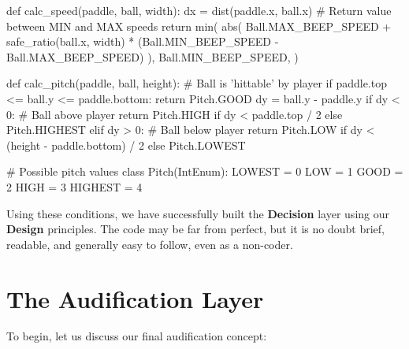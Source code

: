 \documentclass{report}
\newcommand{\design}{\textbf{Design}\xspace}
\newcommand{\decision}{\textbf{Decision}\xspace}
\begin{document}
\begin{codeblock}
def calc_speed(paddle, ball, width):
    dx = dist(paddle.x, ball.x)
    # Return value between MIN and MAX speeds
    return min(
        abs(
            Ball.MAX_BEEP_SPEED
            + safe_ratio(ball.x, width) 
            * (Ball.MIN_BEEP_SPEED - Ball.MAX_BEEP_SPEED)
        ),
        Ball.MIN_BEEP_SPEED,
    )
\end{codeblock}

\begin{codeblock}
def calc_pitch(paddle, ball, height):
    # Ball is 'hittable' by player
    if paddle.top <= ball.y <= paddle.bottom: 
        return Pitch.GOOD
    dy = ball.y - paddle.y
    if dy < 0: # Ball above player
        return Pitch.HIGH 
        if dy < paddle.top / 2 
        else Pitch.HIGHEST
    elif dy > 0: # Ball below player
        return Pitch.LOW 
        if dy < (height - paddle.bottom) / 2 
        else Pitch.LOWEST
\end{codeblock}

\begin{codeblock}
# Possible pitch values 
class Pitch(IntEnum):
    LOWEST = 0
    LOW = 1
    GOOD = 2
    HIGH = 3
    HIGHEST = 4
\end{codeblock}

Using these conditions, we have successfully built the \decision layer using our \design principles. The code may be far from perfect, but it is no doubt brief, readable, and generally easy to follow, even as a non-coder.

\section{The Audification Layer}
To begin, let us discuss our final audification concept:
\end{document}
